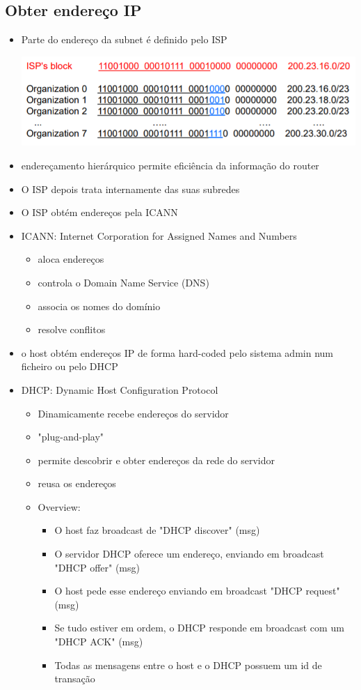 \documentclass[../resumosRCOM.tex]{subfiles}
\begin{document}
\subsection{Obter endereço IP}
\begin{itemize}
    \item Parte do endereço da subnet é definido pelo ISP
    \begin{center}
        \includegraphics[width=14cm]{images/RCOM25.png}
    \end{center}
    \item endereçamento hierárquico permite eficiência da informação do router
    \item O ISP depois trata internamente das suas subredes
    \item O ISP obtém endereços pela ICANN
    \item ICANN: Internet Corporation for Assigned Names and Numbers
    \begin{itemize}
        \item aloca endereços
        \item controla o Domain Name Service (DNS)
        \item associa os nomes do domínio
        \item resolve conflitos
    \end{itemize}
    \item o host obtém endereços IP de forma hard-coded pelo sistema admin num ficheiro ou pelo DHCP
    \item DHCP: Dynamic Host Configuration Protocol
    \begin{itemize}
        \item Dinamicamente recebe endereços do servidor
        \item "plug-and-play"
        \item permite descobrir e obter endereços da rede do servidor
        \item reusa os endereços
        \item Overview:
        \begin{itemize}
            \item O host faz broadcast de "DHCP discover" (msg)
            \item O servidor DHCP oferece um endereço, enviando em broadcast "DHCP offer" (msg)
			\item O host pede esse endereço enviando em broadcast "DHCP request" (msg)
            \item Se tudo estiver em ordem, o DHCP responde em broadcast com um "DHCP ACK" (msg)
            \item Todas as mensagens entre o host e o DHCP possuem um id de transação
        \end{itemize}
    \end{itemize}
\end{itemize}
\end{document}
